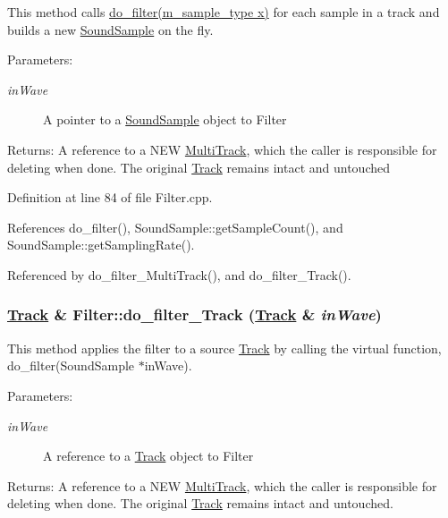 This method calls \hyperlink{classFilter_a3}{do\_\-filter(m\_\-sample\_\-type x)} for each sample in a track and builds a new \hyperlink{classSoundSample}{Sound\-Sample} on the fly.

\begin{Desc}
\item[Parameters:]
\begin{description}
\item[{\em in\-Wave}]A pointer to a \hyperlink{classSoundSample}{Sound\-Sample} object to Filter\end{description}
\end{Desc}
\begin{Desc}
\item[Returns:]A reference to a NEW \hyperlink{classMultiTrack}{Multi\-Track}, which the caller is responsible for deleting when done. The original \hyperlink{classTrack}{Track} remains intact and untouched \end{Desc}


Definition at line 84 of file Filter.cpp.

References do\_\-filter(), Sound\-Sample::get\-Sample\-Count(), and Sound\-Sample::get\-Sampling\-Rate().

Referenced by do\_\-filter\_\-Multi\-Track(), and do\_\-filter\_\-Track().\hypertarget{classFilter_a1}{
\subsubsection[do\_\-filter\_\-Track]{\setlength{\rightskip}{0pt plus 5cm}\hyperlink{classTrack}{Track} \& Filter::do\_\-filter\_\-Track (\hyperlink{classTrack}{Track} \& {\em in\-Wave})}}
\label{classFilter_a1}


This method applies the filter to a source \hyperlink{classTrack}{Track} by calling the virtual function, do\_\-filter(Sound\-Sample $\ast$in\-Wave).

\begin{Desc}
\item[Parameters:]
\begin{description}
\item[{\em in\-Wave}]A reference to a \hyperlink{classTrack}{Track} object to Filter\end{description}
\end{Desc}
\begin{Desc}
\item[Returns:]A reference to a NEW \hyperlink{classMultiTrack}{Multi\-Track}, which the caller is responsible for deleting when done. The original \hyperlink{classTrack}{Track} remains intact and untouched. \end{Desc}


